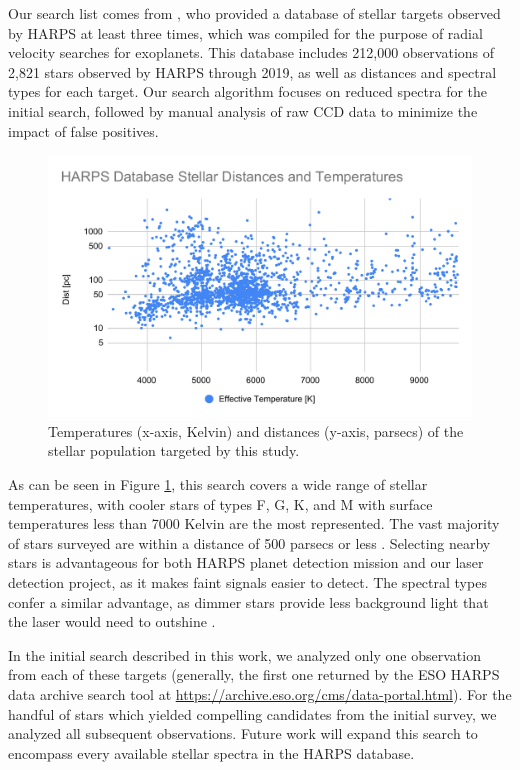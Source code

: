 \documentclass[linenumbers]{aastex631}
\begin{document}
Our search list comes from  \cite{trifonov_2020}, who provided a database of stellar targets observed by HARPS at least three times, which was compiled for the purpose of radial velocity searches for exoplanets.  This database includes 212,000 observations of 2,821 stars observed by HARPS through 2019, as well as distances and spectral types for each target. Our search algorithm focuses on reduced spectra for the initial search, followed by manual analysis of raw CCD data to minimize the impact of false positives.

\begin{figure}
    \centering
    \includegraphics[width=\textwidth]{HARPS Database Stellar Distances and Temperatures (1).pdf}
    \caption{Temperatures (x-axis, Kelvin) and distances (y-axis, parsecs) of the stellar population targeted by this study. }
    \label{fig:starlist}
\end{figure}

As can be seen in Figure \ref{fig:starlist}, this search covers a wide range of stellar temperatures, with cooler stars of types F, G, K, and M with surface temperatures less than 7000 Kelvin are the most represented. The vast majority of stars surveyed  are within a distance of 500 parsecs or less \citep{trifonov_2020}. Selecting nearby stars is advantageous for both HARPS planet detection mission and our laser detection project, as it makes faint signals easier to detect. The spectral types confer a similar advantage, as dimmer stars provide less background light that the laser would need to outshine \citep{Howard_2004}.

In the initial search described in this work, we analyzed only one observation from each of these targets (generally, the first one returned by the ESO HARPS data archive search tool at \url{https://archive.eso.org/cms/data-portal.html}). For the handful of stars which yielded compelling candidates from the initial survey, we analyzed all subsequent observations. Future work will expand this search to encompass every available stellar spectra in the HARPS database.
\end{document}

